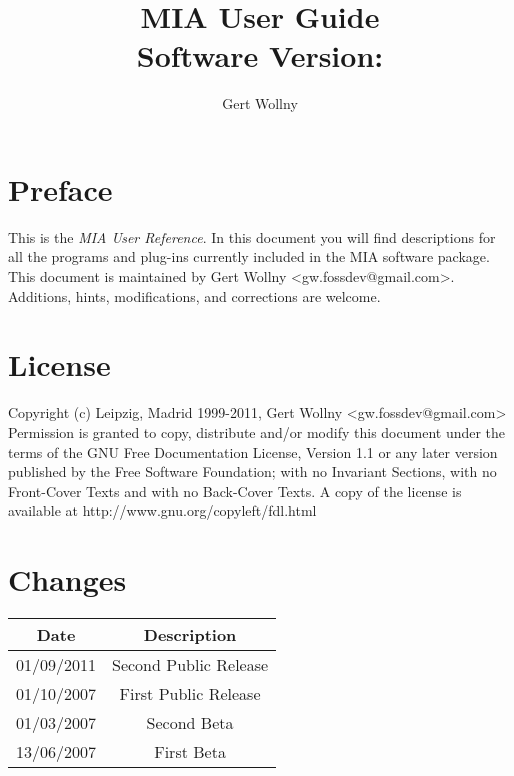 \documentclass[english, 10pt, a4paper,headsepline,openany]{book}
\begin{document}
\vfill{}
\title{MIA User Guide \\Software Version: \miaversion}
\vfill{}


\author{Gert Wollny}

\maketitle

\section*{Preface}

This is the \emph{MIA User Reference}. 
In this document you will find descriptions for all the programs and plug-ins currently included in the 
  MIA software package. 
This document is maintained by Gert Wollny <gw.fossdev@gmail.com>. 
Additions, hints, modifications, and corrections are welcome. 

\section*{License}

Copyright (c) Leipzig, Madrid 1999-2011, Gert Wollny <gw.fossdev@gmail.com>
Permission is granted to copy, distribute and/or modify this document under the terms of the 
  GNU Free Documentation License, Version 1.1 or any later version published by the 
  Free Software Foundation; with no Invariant Sections, 
  with no Front-Cover Texts and with no Back-Cover Texts. 
A copy of the license is available at http://www.gnu.org/copyleft/fdl.html

\section*{Changes}

\begin{center}
\begin{tabular}{cc}
\hline 
Date  & Description\\
\hline
\hline 
01/09/2011 & Second Public Release  \\
01/10/2007 & First Public Release  \\
01/03/2007 & Second Beta \\
13/06/2007 & First Beta  \\
\hline
\end{tabular}
\end{center}

\tableofcontents{}
\end{document}
